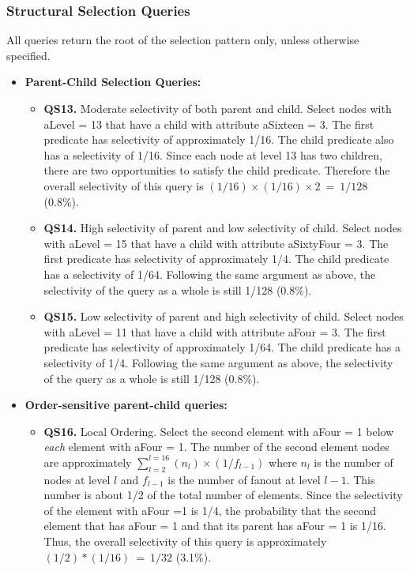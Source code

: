 \subsubsection{Structural Selection Queries}
All queries return the root of the selection pattern only, unless
otherwise specified.
\begin{itemize}
\item
{\bf Parent-Child Selection Queries:}
\begin{itemize}
\item {\bf QS13.} Moderate selectivity of both parent and child.  Select nodes
with {\sf aLevel = 13} that have a child with attribute {\sf aSixteen
= 3}.  The first predicate has selectivity of approximately 1/16. The
child predicate also has a selectivity of 1/16.  Since each node at
level 13 has two children, there are two opportunities to satisfy the
child predicate.  Therefore the overall selectivity of this query is
 $(1/16) \times (1/16) \times 2 ~=~ 1/128$ (0.8\%).

\item {\bf QS14.} High selectivity of parent and low selectivity of child.  Select
nodes with {\sf aLevel = 15} that have a child with attribute {\sf
aSixtyFour = 3}.  The first predicate has selectivity of approximately
1/4.  The child predicate has a selectivity of 1/64.  Following the
same argument as above, the selectivity of the query as a whole is
still 1/128 (0.8\%).

\item {\bf QS15.} Low selectivity of parent and high selectivity of child.  Select
nodes with {\sf aLevel = 11} that have a child with attribute {\sf
aFour = 3}.  The first predicate has selectivity of approximately
1/64.  The child predicate has a selectivity of 1/4.  Following the
same argument as above, the selectivity of the query as a whole is
still 1/128 (0.8\%).
\end{itemize}

\item
{\bf Order-sensitive parent-child queries:}
\begin{itemize}

\item {\bf QS16.} Local Ordering.  Select the second element with {\sf aFour = 1}
below {\em each} element with {\sf aFour = 1}. The number of the second element nodes are approximately $\sum_{l=2}^{l=16} (n_l) \times (1/f_{l-1})$ where $n_l$ is the number of nodes at level $l$ and $f_{l-1}$ is the number of fanout at level $l-1$.  This number is about 1/2 of the total number of elements.  Since the selectivity of the element with {\sf aFour =1} is 1/4, the probability that the second element that has {\sf aFour = 1} and that its parent has {\sf aFour = 1} is 1/16.  Thus, the overall selectivity of this query is approximately $(1/2) * (1/16) ~=~ 1/32$ (3.1\%).


\end{itemize}
\end{itemize}
